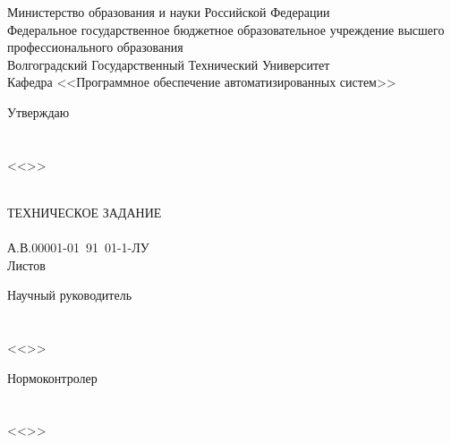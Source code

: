 {{
\sloppy
\clearpage
\thispagestyle{empty}
\begin{center}
Министерство образования и науки Российской Федерации\\
Федеральное государственное бюджетное образовательное учреждение высшего профессионального образования\\
Волгоградский Государственный Технический Университет\\
Кафедра <<Программное обеспечение автоматизированных систем>>\\
\end{center}
\vfill
\hfill
\begin{minipage}[c]{18em}
Утверждаю\\
\VSTUHeadOfDepartmentPost\\
\makebox[2cm]{\hrulefill}\VSTUHeadOfDepartmentDegree~\VSTUHeadOfDepartmentName\\
<<\makebox[1.5cm]{\hrulefill}>>\makebox[3.5cm]{\hrulefill}\the\year
\end{minipage}
\vspace{8mm}
\begin{center}
\VSTUTitle\\
\vspace{8mm}
ТЕХНИЧЕСКОЕ ЗАДАНИЕ\\
\VSTUDocumentCode{}\\
А.В.00001-01\ 91\ 01-1-ЛУ\\
Листов \totalpages\\
\vspace{15mm}
\end{center}
\begin{flushright}
\begin{minipage}[c]{15em}
Научный руководитель\\
\VSTUDirectorDegree{}\\
\makebox[2cm]{\hrulefill}\VSTUDirectorName\\
<<\makebox[1.5cm]{\hrulefill}>>\makebox[3.5cm]{\hrulefill}\the\year
\end{minipage}
\end{flushright}
\vspace{8mm}
\begin{flushleft}
\begin{minipage}[c]{15em}
Нормоконтролер\\
\VSTUStandardsAdviserDegree\\
\makebox[2cm]{\hrulefill}\VSTUStandardsAdviserName\\
<<\makebox[1.5cm]{\hrulefill}>>\makebox[3.5cm]{\hrulefill}\the\year

\end{minipage}
\end{flushleft}}}
